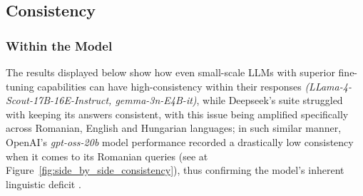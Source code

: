 \documentclass[11pt]{article}
\begin{document}
\subsection{Consistency}
\subsubsection{Within the Model} 
The results displayed below show how even small-scale LLMs with superior fine-tuning capabilities can have high-consistency within their responses \textit{(LLama-4-Scout-17B-16E-Instruct, gemma-3n-E4B-it)}, while Deepseek's suite struggled with keeping its answers consistent, with this issue being amplified specifically across Romanian, English and Hungarian languages; in such similar manner, OpenAI's \textit{gpt-oss-20b} model performance recorded a drastically low consistency when it comes to its Romanian queries (see at Figure~\ref{fig:side_by_side_consistency}), thus confirming the model's inherent linguistic deficit \cite{walker2024}.
\end{document}
